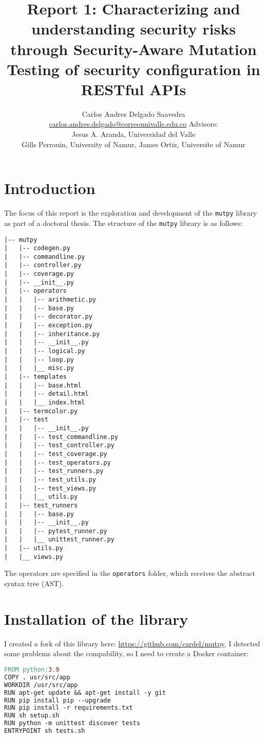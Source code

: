 \documentclass[12pt, letterpaper,twocolumn]{article}
\title{Report 1: Characterizing and understanding security risks through Security-Aware Mutation Testing of security configuration in RESTful APIs}
\author{
    \large{Carlos Andres Delgado Saavedra}\\
    \footnotesize \href{mailto:carlos.andres.delgado@correounivalle.edu.co}{carlos.andres.delgado@correounivalle.edu.co} 
    Advisors:\\
    Jesus A. Aranda, Universidad del Valle \\
    Gills Perrouin, University of Namur,
    James Ortiz, Universite of Namur
    }
\theoremstyle{remark}
\theoremstyle{definition}
\begin{document}
\maketitle

\section{Introduction}

The focus of this report is the exploration and development of the \texttt{mutpy} library as part of a doctoral thesis. The structure of the \texttt{mutpy} library is as follows:

\begin{verbatim}
|-- mutpy
|   |-- codegen.py
|   |-- commandline.py
|   |-- controller.py
|   |-- coverage.py
|   |-- __init__.py
|   |-- operators
|   |   |-- arithmetic.py
|   |   |-- base.py
|   |   |-- decorator.py
|   |   |-- exception.py
|   |   |-- inheritance.py
|   |   |-- __init__.py
|   |   |-- logical.py
|   |   |-- loop.py
|   |   |__ misc.py
|   |-- templates
|   |   |-- base.html
|   |   |-- detail.html
|   |   |__ index.html
|   |-- termcolor.py
|   |-- test
|   |   |-- __init__.py
|   |   |-- test_commandline.py
|   |   |-- test_controller.py
|   |   |-- test_coverage.py
|   |   |-- test_operators.py
|   |   |-- test_runners.py
|   |   |-- test_utils.py
|   |   |-- test_views.py
|   |   |__ utils.py
|   |-- test_runners
|   |   |-- base.py
|   |   |-- __init__.py
|   |   |-- pytest_runner.py
|   |   |__ unittest_runner.py
|   |-- utils.py
|   |__ views.py
\end{verbatim}

The operators are specified in the \texttt{operators} folder, which receives the abstract syntax tree (AST).

\section{Installation of the library}

I created a fork of this library here: \url{https://github.com/cardel/mutpy}, I detected some problems about the compability, so I need to create a Docker container:

\begin{lstlisting}[language=make]
FROM python:3.9
COPY . usr/src/app
WORKDIR /usr/src/app
RUN apt-get update && apt-get install -y git
RUN pip install pip --upgrade
RUN pip install -r requirements.txt
RUN sh setup.sh
RUN python -m unittest discover tests
ENTRYPOINT sh tests.sh
\end{lstlisting}
\end{document}

